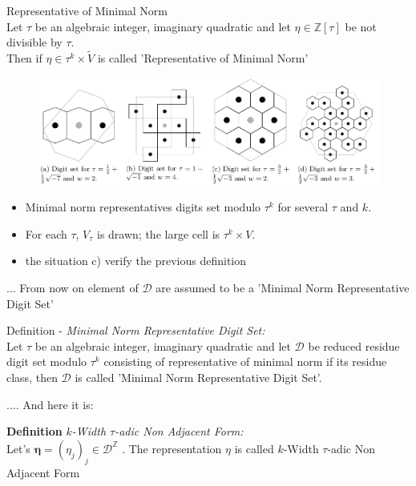 \begin{itemize}
\raggedright
	\begin{mydef}{Representative of Minimal Norm}\\
			Let $\tau$ be an algebraic integer, imaginary quadratic and let 
		$\eta \in \mathbb{Z}[\tau]$ be not divisible by $\tau$. \\
		Then if $\eta \in \tau^k \times \tilde{V}$ is called 
		'Representative of Minimal Norm'

        \begin{figure}[!h]
          \centering
          \includegraphics[width=18cm]{images/voronoi_save.png}
        \end{figure}
    \end{mydef}

\begin{itemize}
\item Minimal norm representatives digits set modulo  $\tau^k$ for several $\tau$ and $k$.
\item For each $\tau$, $V_\tau$ is drawn; the large cell is $\tau^k \times V$.
\item the situation c) verify the previous definition 
\end{itemize}
\vspace{3mm}

\raggedleft 
... From now on element of $\mathcal{D}$ are assumed to be a 'Minimal Norm Representative Digit Set' \\
\raggedright
		Definition - \textit{Minimal Norm Representative Digit Set:} \\
		Let $\tau$ be an algebraic integer, imaginary quadratic 
		and let $\mathcal{D}$ be reduced residue digit set modulo $\tau^k$
		consisting of representative of minimal norm if its residue class,
		then $\mathcal{D}$ is called 'Minimal Norm Representative Digit Set'.\\
\vspace{3mm}

.... And here it is:
\vspace{3mm}

		\textbf{Definition} \textit{$k$-Width $\tau$-adic Non Adjacent Form:} \\
Let's  $\mathbf{\eta}=(\eta_j)_{j} \in \mathcal{D}^\mathbb{Z}$ .
The representation $ \eta $ is called $k$-Width $\tau$-adic Non Adjacent Form


\end{itemize}
